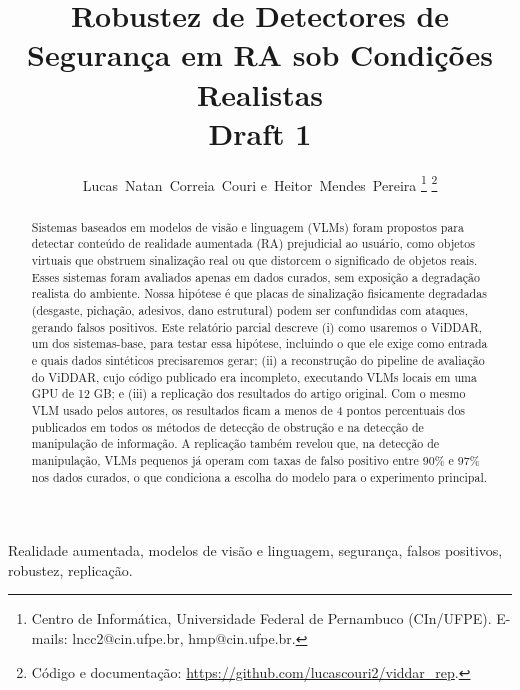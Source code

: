\documentclass[journal,onecolumn]{IEEEtran}
\begin{document}
\title{Robustez de Detectores de Segurança em RA sob Condições Realistas\\
\large Draft 1}

\author{Lucas~Natan~Correia~Couri
        e~Heitor~Mendes~Pereira%
\thanks{Centro de Informática, Universidade Federal de Pernambuco (CIn/UFPE).
E-mails: lncc2@cin.ufpe.br, hmp@cin.ufpe.br.}%
\thanks{Código e documentação: \url{https://github.com/lucascouri2/viddar_rep}.}}


\maketitle

\begin{abstract}
Sistemas baseados em modelos de visão e linguagem (VLMs) foram propostos para detectar conteúdo de
realidade aumentada (RA) prejudicial ao usuário, como objetos virtuais que obstruem sinalização real
ou que distorcem o significado de objetos reais. Esses sistemas foram avaliados apenas em dados
curados, sem exposição a degradação realista do ambiente. Nossa hipótese é que placas de sinalização
fisicamente degradadas (desgaste, pichação, adesivos, dano estrutural) podem ser confundidas com
ataques, gerando falsos positivos. Este relatório parcial descreve (i) como usaremos o ViDDAR, um dos
sistemas-base, para testar essa hipótese, incluindo o que ele exige como entrada e quais dados
sintéticos precisaremos gerar; (ii) a reconstrução do pipeline de avaliação do ViDDAR, cujo código
publicado era incompleto, executando VLMs locais em uma GPU de 12 GB; e (iii) a replicação dos
resultados do artigo original. Com o mesmo VLM usado pelos autores, os resultados ficam a menos de
4 pontos percentuais dos publicados em todos os métodos de detecção de obstrução e na detecção de
manipulação de informação. A replicação também revelou que, na detecção de manipulação, VLMs pequenos
já operam com taxas de falso positivo entre 90\% e 97\% nos dados curados, o que condiciona a escolha
do modelo para o experimento principal.
\end{abstract}

\begin{IEEEkeywords}
Realidade aumentada, modelos de visão e linguagem, segurança, falsos positivos, robustez, replicação.
\end{IEEEkeywords}

\IEEEpeerreviewmaketitle
\end{document}
